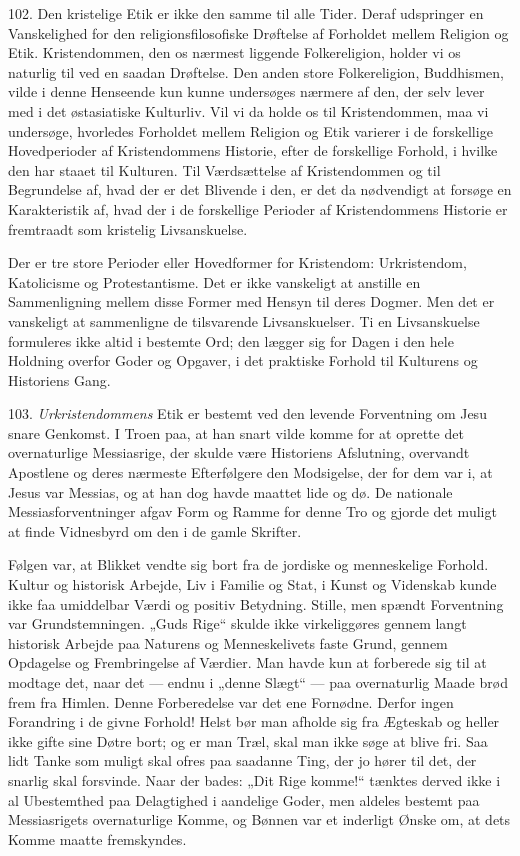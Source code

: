 \documentclass[12pt,a4paper,openany]{book}
\newcommand{\opage}[1]{\marginnote{\footnotesize\textit{[#1]}}}
\begin{document}
102. Den kristelige Etik er ikke den samme til alle Tider. Deraf
udspringer en Vanskelighed for den religionsfilosofiske Drøftelse af
Forholdet mellem Religion og Etik. Kristendommen, den os nærmest
liggende Folkereligion, holder vi os naturlig til ved en saadan
Drøftelse. Den anden store Folkereligion, Buddhismen, vilde i denne
Henseende kun kunne undersøges nærmere af den, der selv lever med i det
østasiatiske Kulturliv. Vil vi da holde os til Kristendommen, maa vi
undersøge, hvorledes Forholdet mellem Religion og Etik varierer i de
forskellige Hovedperioder af Kristendommens Historie, efter de
forskellige Forhold, i hvilke den har staaet til Kulturen. Til
Værdsættelse af Kristendommen og til Begrundelse af, hvad der er det
Blivende i den, er det da nødvendigt at forsøge en Karakteristik af,
hvad der i de forskellige Perioder af Kristendommens Historie er
fremtraadt som kristelig Livsanskuelse.

Der er tre store Perioder eller Hovedformer for Kristendom:
Urkristendom, Katolicisme og Protestantisme. Det er ikke vanskeligt at
anstille en Sammenligning mellem disse Former med Hensyn til deres
Dogmer. Men det er vanskeligt at sammenligne de tilsvarende
Livsanskuelser. Ti en Livsanskuelse formuleres ikke altid i bestemte
Ord; den lægger sig for Dagen i den hele Holdning overfor Goder og
Opgaver, i det praktiske Forhold til Kulturens og Historiens Gang.

103. \textit{Urkristendommens} Etik er bestemt ved den levende
Forventning om Jesu snare Genkomst. I Troen paa, at han snart vilde
komme for at oprette det overnaturlige Messiasrige, der skulde være
Historiens Afslutning, overvandt Apostlene og deres nærmeste
Efterfølgere den Modsigelse, der for dem var i, at Jesus
\opage{230}var Messias, og at han dog havde maattet lide og dø. De
nationale Messiasforventninger afgav Form og Ramme for denne Tro og
gjorde det muligt at finde Vidnesbyrd om den i de gamle Skrifter.

Følgen var, at Blikket vendte sig bort fra de jordiske og menneskelige
Forhold. Kultur og historisk Arbejde, Liv i Familie og Stat, i Kunst og
Videnskab kunde ikke faa umiddelbar Værdi og positiv Betydning. Stille,
men spændt Forventning var Grundstemningen. „Guds Rige“ skulde ikke
virkeliggøres gennem langt historisk Arbejde paa Naturens og
Menneskelivets faste Grund, gennem Opdagelse og Frembringelse af
Værdier. Man havde kun at forberede sig til at modtage det, naar det ---
endnu i „denne Slægt“ --- paa overnaturlig Maade brød frem fra Himlen.
Denne Forberedelse var det ene Fornødne. Derfor ingen Forandring i de
givne Forhold! Helst bør man afholde sig fra Ægteskab og heller ikke
gifte sine Døtre bort; og er man Træl, skal man ikke søge at blive fri.
Saa lidt Tanke som muligt skal ofres paa saadanne Ting, der jo hører til
det, der snarlig skal forsvinde. Naar der bades: „Dit Rige komme!“
tænktes derved ikke i al Ubestemthed paa Delagtighed i aandelige Goder,
men aldeles bestemt paa Messiasrigets overnaturlige Komme, og Bønnen var
et inderligt Ønske om, at dets Komme maatte fremskyndes.
\end{document}
